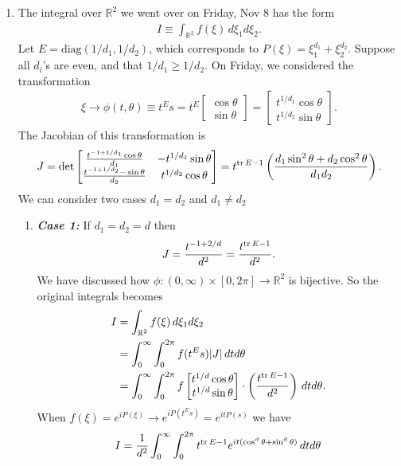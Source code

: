 \documentclass{article}
\theoremstyle{definition}
\newcommand{\nn}{\nonumber}
\newcommand{\f}[2]{\frac{#1}{#2}}
\newcommand{\lp}{\left(}
\newcommand{\rp}{\right)}
\begin{document}
\begin{enumerate}
	\item The integral over $\mathbb{R}^2$ we went over on Friday, Nov 8 has the form
	\begin{align}
	I \equiv \int_{\mathbb{R}^2}f(\xi)\,d\xi_1d\xi_2.
	\end{align}
	Let $E = \text{diag}(1/d_1, 1/d_2)$, which corresponds to $P(\xi) = \xi_1^{d_1} + \xi_2^{d_2}$. Suppose all $d_i$'s are even, and that $1/d_1 \geq 1/d_2$. On Friday, we considered the transformation
	\begin{align}
	\xi \to \phi(t,\theta) \equiv t^Es  = t^E\begin{bmatrix}
	\cos\theta \\ \sin\theta
	\end{bmatrix} = \begin{bmatrix}
	t^{1/d_1} \cos\theta \\ t^{1/d_2}\sin\theta
	\end{bmatrix}.
	\end{align}
	The Jacobian of this transformation is
	\begin{align}
	J = \det\begin{bmatrix}
	\f{{t^{-1+1/d_1}} \cos \theta}{d_1} & -t^{1/d_1} \sin
	\theta  \\
	\f{{t^{-1+1/d_2}-} \sin \theta }{d_2} & t^{1/d_2} \cos
	\theta  \\
	\end{bmatrix} = t^{\tr E-1}\lp\frac{d_1\sin ^2\theta + d_2\cos^2\theta}{d_1 d_2}\rp.
	\end{align}
	We can consider two cases $d_1 = d_2$ and $d_1 \neq d_2$
	\begin{enumerate}
		\item \textbf{\textit{Case 1:}} If $d_1 = d_2 = d$ then 
		\begin{align}
		J = \f{t^{-1+2/d}}{d^2} = \f{t^{\tr E -1 }}{d^2}.
		\end{align}
		We have discussed how $\phi: (0,\infty)\times [0,2\pi] \to \mathbb{R}^2$ is bijective. So the original integrals becomes 
		\begin{align}
		I &= \int_{\mathbb{R}^2}f(\xi)\,d\xi_1d\xi_2 \nn\\
		&= \int_0^\infty \int_0^{2\pi} f(t^Es) \abs{J}\,dtd\theta\nn\\
		&= \int_0^\infty \int_0^{2\pi}f\begin{bmatrix}
		t^{1/d} \cos\theta \\ t^{1/d}\sin\theta
		\end{bmatrix}\cdot\lp \f{t^{\tr E -1 }}{d^2} \rp\,dtd\theta.
		\end{align}
		When $f(\xi) = e^{iP(\xi)} \to e^{iP(t^Es)} = e^{itP(s)}$ we have
		\begin{align}
		{I = \f{1}{d^2}\int_0^\infty \int_0^{2\pi} t^{\tr E -1 } e^{it(\cos^d\theta + \sin^d \theta)}\,dtd\theta}
		\end{align}
		

\end{enumerate}
\end{enumerate}
\end{document}
